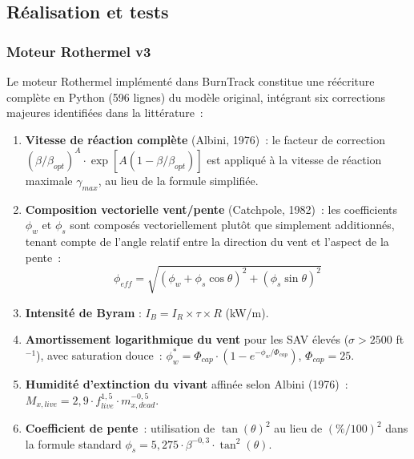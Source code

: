 
\subsection{Réalisation et tests}

\subsubsection{Moteur Rothermel v3}

Le moteur Rothermel implémenté dans BurnTrack constitue une réécriture complète en Python (596 lignes) du modèle original, intégrant six corrections majeures identifiées dans la littérature~:

\begin{enumerate}[nosep]
    \item \textbf{Vitesse de réaction complète} (Albini, 1976)~: le facteur de correction $(\beta/\beta_{opt})^A \cdot \exp[A(1-\beta/\beta_{opt})]$ est appliqué à la vitesse de réaction maximale $\gamma_{max}$, au lieu de la formule simplifiée.
    \item \textbf{Composition vectorielle vent/pente} (Catchpole, 1982)~: les coefficients $\phi_w$ et $\phi_s$ sont composés vectoriellement plutôt que simplement additionnés, tenant compte de l'angle relatif entre la direction du vent et l'aspect de la pente~:
    \begin{equation}
    \phi_{eff} = \sqrt{(\phi_w + \phi_s \cos\theta)^2 + (\phi_s \sin\theta)^2}
    \end{equation}
    \item \textbf{Intensité de Byram} : $I_B = I_R \times \tau \times R$ (kW/m).
    \item \textbf{Amortissement logarithmique du vent} pour les SAV élevés ($\sigma > 2500$ ft$^{-1}$), avec saturation douce~: $\phi_w^* = \Phi_{cap} \cdot (1 - e^{-\phi_w / \Phi_{cap}})$, $\Phi_{cap} = 25$.
    \item \textbf{Humidité d'extinction du vivant} affinée selon Albini (1976)~: $M_{x,live} = 2{,}9 \cdot f_{live}^{1,5} \cdot m_{x,dead}^{-0,5}$.
    \item \textbf{Coefficient de pente}~: utilisation de $\tan(\theta)^2$ au lieu de $(\%/100)^2$ dans la formule standard $\phi_s = 5{,}275 \cdot \beta^{-0,3} \cdot \tan^2(\theta)$.
\end{enumerate}

